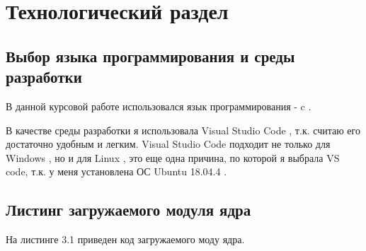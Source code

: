 \chapter{Технологический раздел}
\label{cha:design}

\section{Выбор языка программирования и среды разработки}

В данной курсовой работе использовался язык программирования - c \cite{bib1}.

В качестве среды разработки я использовала Visual Studio Code \cite{bib2}, т.к. считаю его достаточно удобным и легким.
Visual Studio Code подходит не только для  Windows \cite{bib3}, но и для Linux \cite{bib4}, это еще одна причина, по которой я выбрала VS code,
т.к. у меня установлена ОС Ubuntu 18.04.4 \cite{bib5}.

\section{Листинг загружаемого модуля ядра}

На листинге 3.1 приведен код загружаемого моду ядра. 

